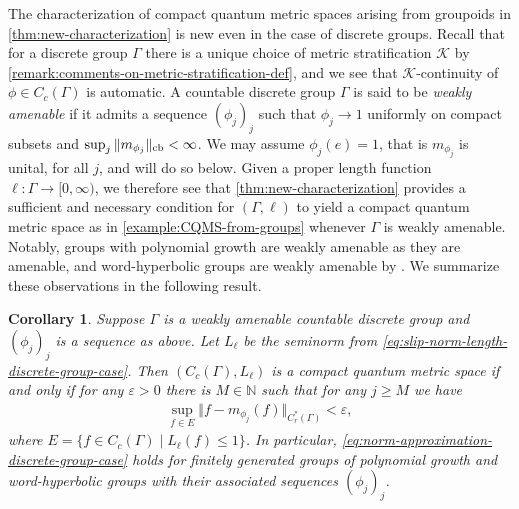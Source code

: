 \documentclass[11pt,a4paper,oneside,final,reqno]{amsart}
\newtheorem{corollary}[lemma]{Corollary}
\theoremstyle{definition}
\newcommand{\cK}{\mathcal{K}}
\newcommand{\Cred}{C_{r}^{*}}
\newcommand{\N}{\mathbb{N}}
\numberwithin{equation}{section}
\begin{document}
		
		The characterization of compact quantum metric spaces arising from groupoids in \cref{thm:new-characterization} is new even in the case of discrete groups. Recall that for a discrete group $\Gamma$ there is a unique choice of metric stratification $\cK$ by \cref{remark:comments-on-metric-stratification-def}, and we see that $\cK$-continuity of $\phi \in C_c(\Gamma)$ is automatic. 
		A countable discrete group $\Gamma$  is said to be \emph{weakly amenable} if it admits a sequence $(\phi_j)_j$ such that $\phi_j \to 1$ uniformly on compact subsets and
		$\sup_j \Vert m_{\phi_j} \Vert_{\rm cb} < \infty$. 
		We may assume $\phi_j(e) = 1$, that is $m_{\phi_j}$ is unital, for all $j$, and will do so below. 
		Given a proper length function $\ell \colon \Gamma \to [0,\infty)$, we therefore see that \cref{thm:new-characterization} provides a sufficient and necessary condition for $(\Gamma, \ell)$ to yield a compact quantum metric space as in  \cref{example:CQMS-from-groups} whenever $\Gamma$ is weakly amenable. Notably, groups with polynomial growth are weakly amenable as they are amenable, and word-hyperbolic groups are weakly amenable by \cite{OzawaHyperbolicWeakAmenable2008}. We summarize these observations in the following result. 
		\begin{corollary}\label{cor:FD-CQMS-approx-discrete-groups}
			Suppose $\Gamma$ is a weakly amenable countable discrete group and  $(\phi_j)_j$ is a sequence as above. Let $L_\ell$ be the seminorm from \eqref{eq:slip-norm-length-discrete-group-case}.  Then $(C_c (\Gamma), L_\ell)$ is a compact quantum metric space if and only if  for any $\varepsilon > 0$ there is $M \in \N$ such that for any $j \geq M$ we have
			\begin{align}\label{eq:norm-approximation-discrete-group-case}
				\sup_{f \in E} \Vert f - m_{\phi_j}(f) \Vert_{\Cred(\Gamma)} < \varepsilon,
			\end{align}
			where 
			$E = \{ f\in C_c (\Gamma) \mid  L_\ell(f) \leq 1\}$. 
			In particular, \eqref{eq:norm-approximation-discrete-group-case} holds for finitely generated groups of polynomial growth and word-hyperbolic groups with their associated sequences $(\phi_j)_j$. 
			
 
		\end{corollary}
		
\end{document}
